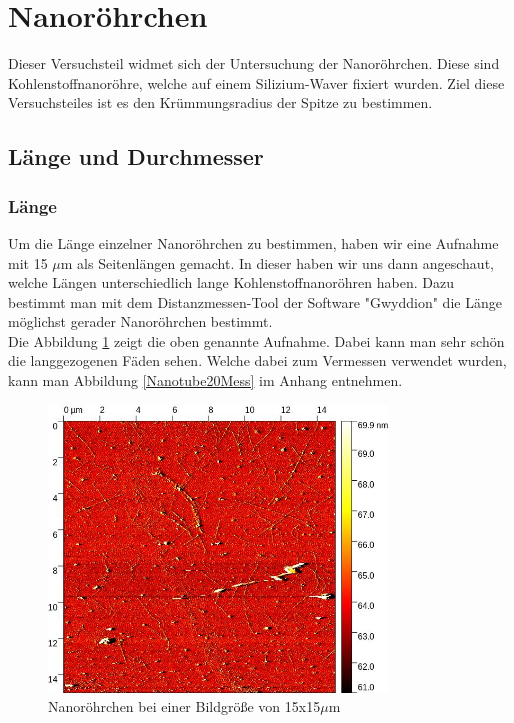 

\section{Nanoröhrchen}
Dieser Versuchsteil widmet sich der Untersuchung der Nanoröhrchen. Diese sind Kohlenstoffnanoröhre, welche auf einem Silizium-Waver 
fixiert wurden. Ziel diese Versuchsteiles ist es den Krümmungsradius der Spitze zu bestimmen.
\subsection{Länge und Durchmesser}
\subsubsection*{Länge}
Um die Länge einzelner Nanoröhrchen zu bestimmen, haben wir eine Aufnahme mit 15 $\mu$m als Seitenlängen gemacht. In dieser haben wir uns 
dann angeschaut, welche Längen unterschiedlich lange Kohlenstoffnanoröhren haben. Dazu bestimmt man mit dem Distanzmessen-Tool der Software 
"Gwyddion" \footnotemark {} die Länge möglichst gerader Nanoröhrchen bestimmt. \\
Die Abbildung \ref{Nanotube20} zeigt die oben genannte Aufnahme. Dabei kann man sehr schön die langgezogenen Fäden sehen. Welche dabei zum Vermessen verwendet wurden, 
kann man Abbildung \ref{Nanotube20Mess} im Anhang entnehmen.

\begin{figure}[h]
    \centering
    \includegraphics[width = 9cm]{Bilder/Nanotubes/NanoTube15um.jpg}
    \caption{Nanoröhrchen bei einer Bildgröße von 15x15$\mu$m}
    \label{Nanotube20}
\end{figure}


